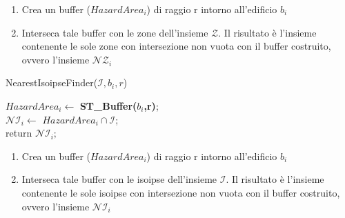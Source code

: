 \begin{enumerate}
	\item Crea un buffer ($ HazardArea_i $) di raggio r intorno all'edificio $b_i$
	\item Interseca tale buffer con le zone dell’insieme $\mathcal{Z}$. Il risultato è l’insieme contenente le sole zone con intersezione non vuota con il buffer costruito, ovvero l’insieme  $\mathcal{NZ}_i$
\end{enumerate}

\begin{algorithm}[H]
	
	
	\IncMargin{1em}
	\caption{NearestIsoipseFinder($\mathcal{I},b_i,r$)}
	\label{alg:two}
	\BlankLine
	\SetAlgoNoLine
	$  HazardArea_i   \leftarrow $ \textbf{ST\_Buffer($b_i$,r)}; \\
	$ \mathcal{NI}_i \leftarrow $ $HazardArea_i \cap \mathcal{I} $; \\
	return $\mathcal{NI}_i;$
\end{algorithm}
\begin{enumerate}
	\item Crea un buffer ($ HazardArea_i $) di raggio r intorno all'edificio $b_i$
	\item Interseca tale buffer con le isoipse dell’insieme $\mathcal{I}$. Il risultato è l’insieme contenente le sole isoipse con intersezione non vuota con il buffer costruito, ovvero l’insieme  $\mathcal{NI}_i$
\end{enumerate}

